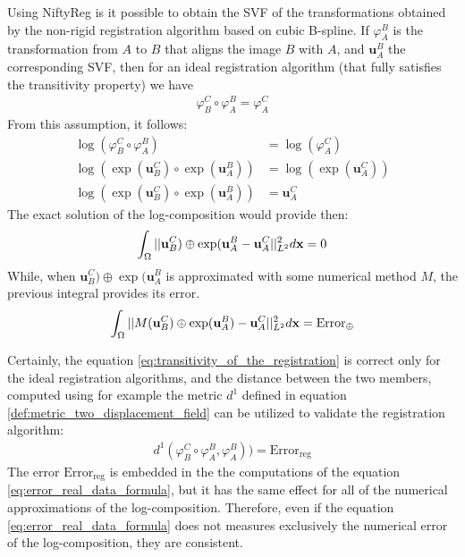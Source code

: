 Using NiftyReg is it possible to obtain the SVF of the transformations obtained by the non-rigid registration algorithm based on cubic B-spline. If $\varphi_{A}^{B}$ is the transformation from $A$ to $B$ that aligns the image $B$ with $A$, and $\mathbf{u}_{A}^{B}$ the corresponding SVF, then for an ideal registration algorithm (that fully satisfies the transitivity property) we have
\begin{align}\label{eq:transitivity_of_the_registration}
\varphi_{B}^{C} \circ \varphi_{A}^{B} = \varphi_{A}^{C}  
\end{align}
From this assumption, it follows:
\begin{align*}
\log(\varphi_{B}^{C} \circ \varphi_{A}^{B}) &= \log(\varphi_{A}^{C}  ) \\
\log(\exp(\mathbf{u}_{B}^{C}) \circ \exp(\mathbf{u}_{A}^{B})) &= \log(\exp(\mathbf{u}_{A}^{C}  ) ) \\
\log(\exp(\mathbf{u}_{B}^{C}) \circ \exp(\mathbf{u}_{A}^{B})) &= \mathbf{u}_{A}^{C}  
\end{align*}
The exact solution of the log-composition would provide then:
\begin{align*}
\int_{\Omega} \vert\lvert 
	\mathbf{u}_{B}^{C}) \oplus \exp(\mathbf{u}_{A}^{B}
	-
	\mathbf{u}_{A}^{C}
 \rvert\vert_{L^2}^{2} d\mathbf{x} 
 =
 0
\end{align*} 
While, when $\mathbf{u}_{B}^{C}) \oplus \exp(\mathbf{u}_{A}^{B}$ is approximated with some numerical method $M$, the previous integral provides its error.
\begin{align}\label{eq:error_real_data_formula} 
\int_{\Omega} \vert\lvert 
	M(\mathbf{u}_{B}^{C}) \oplus \exp(\mathbf{u}_{A}^{B})
	-
	\mathbf{u}_{A}^{C}
 \rvert\vert_{L^2}^{2} d\mathbf{x} 
=
\text{Error}_{\oplus}
\end{align} 

Certainly, the equation \ref{eq:transitivity_of_the_registration} is correct only for the ideal registration algorithms, and the distance between the two members, computed using for example the metric $d^{1}$ defined in equation \ref{def:metric_two_displacement_field} can be utilized to validate the registration algorithm:
\begin{align*}
d^{1}(\varphi_{B}^{C} \circ \varphi_{A}^{B} ,\varphi_{A}^{B}) ) 
= 
\text{Error}_{\text{reg}}
\end{align*} 
The error $\text{Error}_{\text{reg}}$ is embedded in the the computations of the equation \ref{eq:error_real_data_formula}, but it has the same effect for all of the numerical approximations of the log-composition. Therefore, even if the equation \ref{eq:error_real_data_formula} does not measures exclusively the numerical error of the log-composition, they are consistent.

